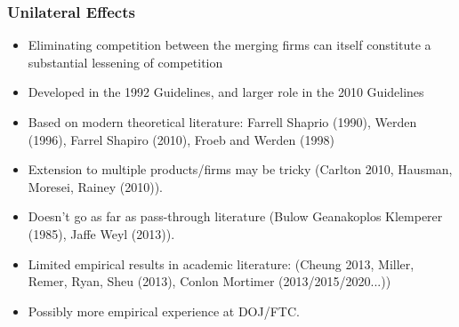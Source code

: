 \documentclass[xcolor=pdftex,dvipsnames,table,mathserif,aspectratio=169]{beamer}
\begin{document}
\begin{frame}
\frametitle{Unilateral Effects}
\begin{itemize}
\item Eliminating competition between the merging firms can itself constitute a substantial lessening of competition
\item Developed in the 1992 Guidelines, and larger role in the 2010 Guidelines
\item Based on modern theoretical literature: Farrell Shaprio (1990), Werden (1996), Farrel Shapiro (2010), Froeb and Werden (1998)
\item Extension to multiple products/firms may be tricky (Carlton 2010, Hausman, Moresei, Rainey (2010)).
\item Doesn't go as far as pass-through literature (Bulow Geanakoplos Klemperer (1985), Jaffe Weyl (2013)). 
\item Limited empirical results in academic literature: (Cheung 2013, Miller, Remer, Ryan, Sheu (2013), Conlon Mortimer (2013/2015/2020...))
\item Possibly more empirical experience at DOJ/FTC.
\end{itemize} 
\end{frame}


\end{document}
